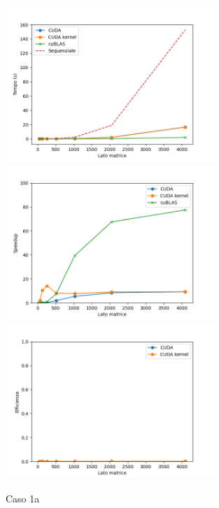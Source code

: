 \begin{figure}[h]
    \centering
    \includegraphics[width=0.7\textwidth]{./imgs/graphs/caso_0.png}
    \includegraphics[width=0.7\textwidth]{./imgs/graphs/caso_0_speedup.png}
    \includegraphics[width=0.7\textwidth]{./imgs/graphs/caso_0_efficiency.png}
    \caption{Caso 1a}
\end{figure}

